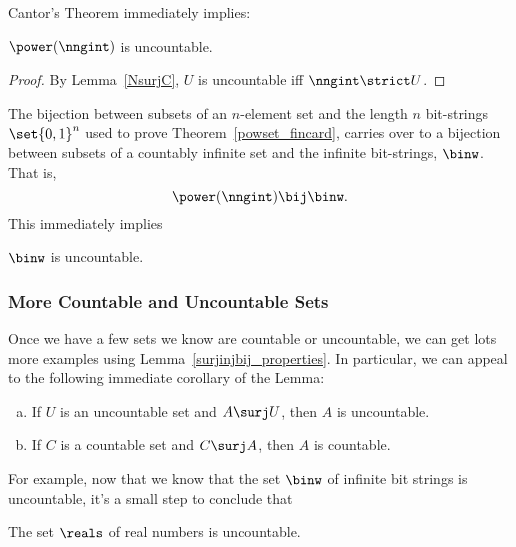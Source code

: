 Cantor's Theorem immediately implies:
\begin{corollary}
$\power(\nngint)$ is uncountable.
\end{corollary}

\begin{proof}
By Lemma~\ref{NsurjC}, $U$ is uncountable iff $\nngint \strict U$.
\end{proof}

The bijection between subsets of an $n$-element set and the length $n$
bit-strings $\set{0,1}^n$ used to prove
Theorem~\ref{powset_fincard}, carries over to a bijection between
subsets of a countably infinite set and the infinite bit-strings,
$\binw$.  That is,
\[
\power(\nngint) \bij \binw.
\]
This immediately implies
\begin{corollary}
$\binw$ is uncountable.
\end{corollary}

\subsubsection{More Countable and Uncountable Sets}

Once we have a few sets we know are countable or uncountable, we can
get lots more examples using Lemma~\ref{surjinjbij_properties}.  In particular, 
we can appeal to the following immediate corollary of the Lemma:
\noindent \begin{corollary}\label{UinjAu}
\mbox{}
\begin{enumerate}[(a)]

\item\label{AsurjUA}
If $U$ is an uncountable set and $A \surj U$, then $A$ is uncountable.

\item\label{CsurjAc}
If $C$ is a countable set and $C \surj A$, then $A$ is countable.
\end{enumerate}
\end{corollary}

For example, now that we know that the set $\binw$ of infinite bit
strings is uncountable, it's a small step to conclude that
\begin{corollary}\label{uncountR}
The set $\reals$ of real numbers is uncountable.
\end{corollary}

